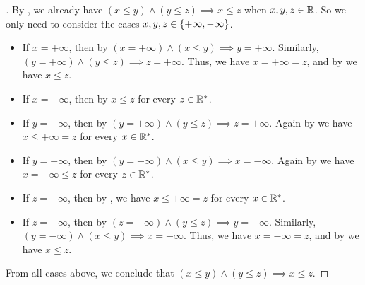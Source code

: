 \begin{proof}[]
  By , we already have \((x \leq y) \land (y \leq z) \implies x \leq z\) when \(x, y, z \in \mathbb{R}\).
  So we only need to consider the cases \(x, y, z \in \left\lbrace+\infty, -\infty\right\rbrace\).
  \begin{itemize}
    \item If \(x = +\infty\), then by  \((x = +\infty) \land (x \leq y) \implies y = +\infty\).
          Similarly, \((y = +\infty) \land (y \leq z) \implies z = +\infty\).
          Thus, we have \(x = +\infty = z\), and by  we have \(x \leq z\).
    \item If \(x = -\infty\), then by  \(x \leq z \) for every \(z \in \mathbb{R}^*\).
    \item If \(y = +\infty\), then by  \((y = +\infty) \land (y \leq z) \implies z = +\infty\).
          Again by  we have \(x \leq +\infty = z\) for every \(x \in \mathbb{R}^*\).
    \item If \(y = -\infty\), then by  \((y = -\infty) \land (x \leq y) \implies x = -\infty\).
          Again by  we have \(x = -\infty \leq z\) for every \(z \in \mathbb{R}^*\).
    \item If \(z = +\infty\), then by , we have \(x \leq +\infty = z\) for every \(x \in \mathbb{R}^*\).
    \item If \(z = -\infty\), then by  \((z = -\infty) \land (y \leq z) \implies y = -\infty\).
          Similarly, \((y = -\infty) \land (x \leq y) \implies x = -\infty\).
          Thus, we have \(x = -\infty = z\), and by  we have \(x \leq z\).
  \end{itemize}
  From all cases above, we conclude that \((x \leq y) \land (y \leq z) \implies x \leq z\).
\end{proof}

